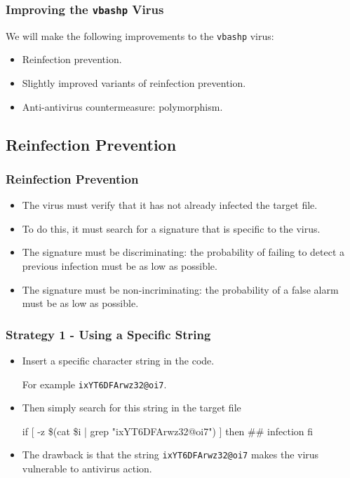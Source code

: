 \documentclass{beamer}
\begin{document}
\begin{frame}
\frametitle{Improving the \texttt{vbashp} Virus}%

We will make the following improvements to the \texttt{vbashp} virus: %

\begin{itemize}
\item Reinfection prevention.
\item Slightly improved variants of reinfection prevention.
\item Anti-antivirus countermeasure: polymorphism.
\end{itemize}
\end{frame}



\subsection{Reinfection Prevention}

\begin{frame}
\frametitle{Reinfection Prevention}
\begin{itemize}
\item The virus must verify that it has not already infected the target file.
\item To do this, it must search for a signature that is specific to the virus.
\item The signature must be discriminating: the probability of failing to detect a previous infection must be as low as possible.
\item The signature must be non-incriminating: the probability of a false alarm must be as low as possible.
\end{itemize}
\end{frame}




\begin{frame}[fragile]
\frametitle{Strategy 1 - Using a Specific String}

\begin{itemize}
\item Insert a specific character string in the code.


For example {\color{blue} \texttt{ixYT6DFArwz32@oi7}. }


\item Then simply search for this string in the target file
\begin{semiverbatim}
if [ -z \$(cat \$i | grep "ixYT6DFArwz32@oi7") ]
then
     \#\# infection
fi
\end{semiverbatim}
\item The drawback is that the string \texttt{ixYT6DFArwz32@oi7} makes the virus vulnerable to antivirus action.
\end{itemize}
\end{frame}
\end{document}
